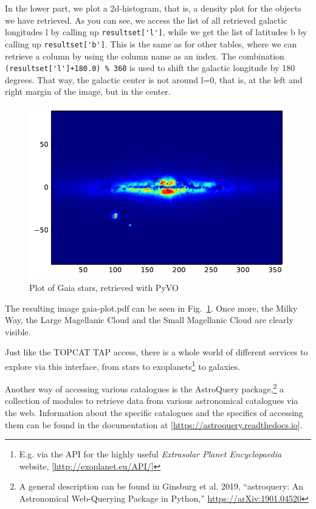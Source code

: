 \documentclass[twocolumn,apj]{openjournal}
\begin{document}
In the lower part, we plot a 2d-histogram, that is, a density plot for the objects we have retrieved. As you can see, we access the list of all retrieved galactic longitudes l by calling up \verb|resultset['l']|, while we get the list of latitudes b by calling up \verb|resultset['b']|. This is the same as for other tables, where we can retrieve a column by using the column name as an index. The combination \verb|(resultset['l']+180.0) % 360| 
is used to shift the galactic longitude by 180 degrees. That way, the galactic center is not around l=0, that is, at the left and right margin of the image, but in the center.\begin{figure}[htbp]
\begin{center}
\includegraphics[width=\linewidth]{gaia-plot.pdf}
\caption{Plot of Gaia stars, retrieved with PyVO}
\label{GaiaPlot}
\end{center}
\end{figure}
The resulting image gaia-plot.pdf can be seen in Fig.~\ref{GaiaPlot}.
Once more, the Milky Way, the Large Magellanic Cloud and the Small Magellanic Cloud are clearly visible.

Just like the TOPCAT TAP access, there is a whole world of different services to explore via this interface, from stars to exoplanets\footnote{E.g. via the API for the highly useful {\em Extrasolar Planet Encyclopaedia} website, [\href{http://exoplanet.eu/API/}{http://exoplanet.eu/API/}]} to galaxies. 

Another way of accessing various catalogues is the AstroQuery package,\footnote{A general description can be found in Ginsburg et al. 2019, ``astroquery: An Astronomical Web-Querying Package in Python,'' \href{https://arxiv.org/abs/1901.04520}{https://arXiv:1901.04520}} a collection of modules to retrieve data from various astronomical catalogues via the web. Information about the specific catalogues and the specifics of accessing them can be found in the documentation at [\href{https://astroquery.readthedocs.io}{https://astroquery.readthedocs.io}].
\end{document}
